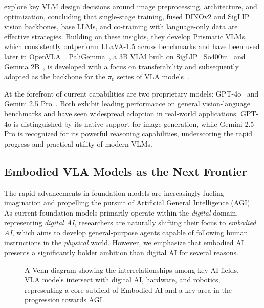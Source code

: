 \documentclass[10pt, a4paper, logo, copyright]{googledeepmind} %
\begin{document}
\citet{karamcheti2024prismatic} explore key VLM design decisions around image preprocessing, architecture, and optimization, concluding that single-stage training, fused DINOv2 and SigLIP vision backbones, base LLMs, and co-training with language-only data are effective strategies. Building on these insights, they develop Prismatic VLMs, which consistently outperform LLaVA-1.5 across benchmarks and have been used later in OpenVLA~\cite{kim2024openvla}. PaliGemma~\cite{beyer2024paligemma}, a 3B VLM built on SigLIP~\cite{zhai2023sigmoid} So400m~\cite{alabdulmohsin2023getting} and Gemma 2B~\cite{team2024gemma}, is developed with a focus on transferability and subsequently adopted as the backbone for the $\pi_0$ series of VLA models~\cite{black2410pi0,Pi0-FAST,shi2025hi,intelligence2025pi05visionlanguageactionmodelopenworld,driess2025knowledge}. 

At the forefront of current capabilities are two proprietary models: GPT-4o~\cite{openai2024gpt4ocard} and Gemini 2.5 Pro~\cite{gemini25}. Both exhibit leading performance on general vision-language benchmarks and have seen widespread adoption in real-world applications. GPT-4o is distinguished by its native support for image generation, while Gemini 2.5 Pro is recognized for its powerful reasoning capabilities, underscoring the rapid progress and practical utility of modern VLMs.

\subsection{Embodied VLA Models as the Next Frontier}
\label{sec:next-frontier}

The rapid advancements in foundation models are increasingly fueling imagination and propelling the pursuit of Artificial General Intelligence (AGI). As current foundation models primarily operate within the \emph{digital} domain, representing \emph{digital AI}, researchers are naturally shifting their focus to \emph{embodied AI}, which aims to develop general-purpose agents capable of following human instructions in the \emph{physical} world. However, we emphasize that embodied AI presents a significantly bolder ambition than digital AI for several reasons.

\begin{figure}
\vspace{-10pt}
\centering

\caption{A Venn diagram showing the interrelationships among key AI fields. VLA models intersect with digital AI, hardware, and robotics, representing a core subfield of Embodied AI and a key area in the progression towards AGI.}
\label{fig:ai-fields}
\vspace{-10pt}
\end{figure}
\end{document}
